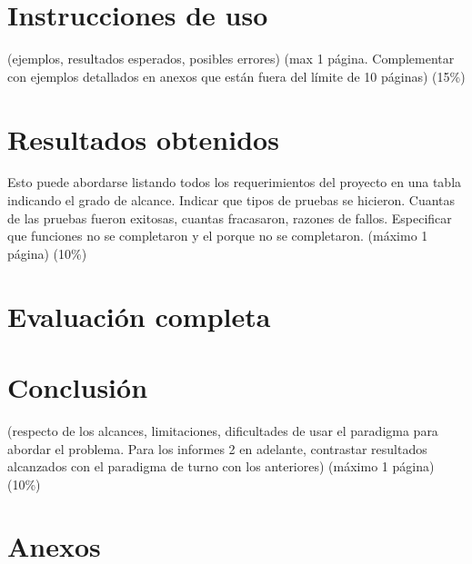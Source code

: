 \documentclass[10pt,letterpaper,openany]{article}
\begin{document}
    \section{Instrucciones de uso}
    (ejemplos, resultados esperados, posibles errores) (max 1 página. Complementar con ejemplos detallados en anexos que están fuera del límite de 10 páginas) (15\%)

    \section{Resultados obtenidos}
    Esto puede abordarse listando todos los requerimientos del proyecto en una tabla indicando el grado de alcance. Indicar que tipos de pruebas se hicieron. Cuantas de las pruebas fueron exitosas, cuantas fracasaron, razones de fallos. Especificar que funciones no se completaron y el porque no se completaron. (máximo 1 página) (10\%)

    \section{Evaluación completa}
    \cite{einstein}

    \section{Conclusión}
    (respecto de los alcances, limitaciones, dificultades de usar el paradigma para abordar el problema. Para los informes 2 en adelante, contrastar resultados alcanzados con el paradigma de turno con los anteriores) (máximo 1 página) (10\%)

    \newpage
    
    
    
    \section*{Anexos}
        
\end{document}
